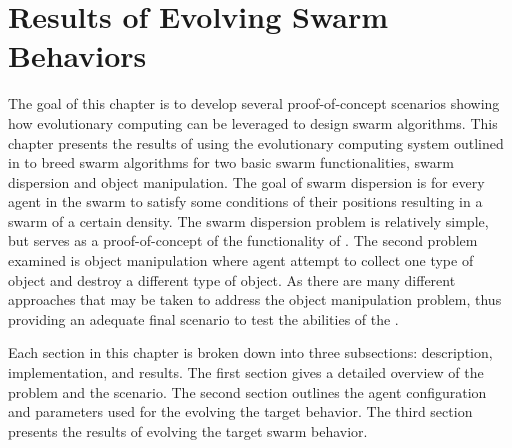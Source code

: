 \chapter{Results of Evolving Swarm Behaviors}
\label{ch:Results}

The goal of this chapter is to develop several proof-of-concept scenarios showing how evolutionary computing can be leveraged to design swarm algorithms.  This chapter presents the results of using the evolutionary computing system outlined in  to breed swarm algorithms for two basic swarm functionalities, swarm dispersion and object manipulation.  The goal of swarm dispersion is for every agent in the swarm to satisfy some conditions of their positions resulting in a swarm of a certain density.  The swarm dispersion problem is relatively simple, but serves as a proof-of-concept of the functionality of \ECS.  The second problem examined is object manipulation where agent attempt to collect one type of object and destroy a different type of object.  As there are many different approaches that may be taken to address the object manipulation problem, thus providing an adequate final scenario to test the abilities of the \ECS.

Each section in this chapter is broken down into three subsections: description, implementation, and results.  The first section gives a detailed overview of the problem and the scenario.  The second section outlines the agent configuration and parameters used for the evolving the target behavior.  The third section presents the results of evolving the target swarm behavior.



